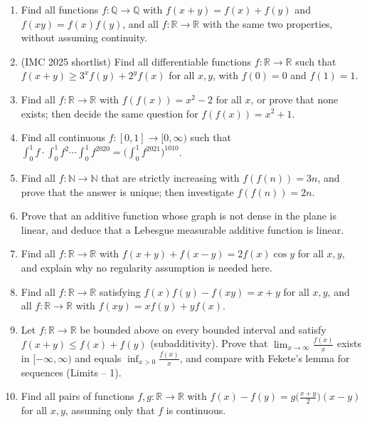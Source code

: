 \documentclass[11pt,a4paper]{article}
\renewcommand{\le}{\leqslant}
\renewcommand{\ge}{\geqslant}
\begin{document}
\begin{enumerate}[leftmargin=2.2em,itemsep=0.6em]
\item Find all functions $f\colon\mathbb Q\to\mathbb Q$ with $f(x+y)=f(x)+f(y)$ and $f(xy)=f(x)f(y)$,
and all $f\colon\mathbb R\to\mathbb R$ with the same two properties, without assuming continuity.

\item (IMC 2025 shortlist) Find all differentiable functions $f\colon\mathbb R\to\mathbb R$ such that
$f(x+y)\ge3^xf(y)+2^yf(x)$ for all $x,y$, with $f(0)=0$ and $f(1)=1$.

\item Find all $f\colon\mathbb R\to\mathbb R$ with $f(f(x))=x^2-2$ for all $x$, or prove that none
exists; then decide the same question for $f(f(x))=x^2+1$.

\item Find all continuous $f\colon[0,1]\to[0,\infty)$ such that
$\int_0^1f\cdot\int_0^1f^2\cdots\int_0^1f^{2020}=\bigl(\int_0^1f^{2021}\bigr)^{1010}$.

\item Find all $f\colon\mathbb N\to\mathbb N$ that are strictly increasing with $f(f(n))=3n$, and
prove that the answer is unique; then investigate $f(f(n))=2n$.

\item Prove that an additive function whose graph is not dense in the plane is linear, and deduce that a
Lebesgue measurable additive function is linear.

\item Find all $f\colon\mathbb R\to\mathbb R$ with $f(x+y)+f(x-y)=2f(x)\cos y$ for all $x,y$, and
explain why no regularity assumption is needed here.

\item Find all $f\colon\mathbb R\to\mathbb R$ satisfying $f(x)f(y)-f(xy)=x+y$ for all $x,y$, and all
$f\colon\mathbb R\to\mathbb R$ with $f(xy)=xf(y)+yf(x)$.

\item Let $f\colon\mathbb R\to\mathbb R$ be bounded above on every bounded interval and satisfy
$f(x+y)\le f(x)+f(y)$ (subadditivity). Prove that $\lim_{x\to\infty}\frac{f(x)}x$ exists in
$[-\infty,\infty)$ and equals $\inf_{x>0}\frac{f(x)}x$, and compare with Fekete's lemma for sequences
(Limits -- 1).

\item Find all pairs of functions $f,g\colon\mathbb R\to\mathbb R$ with
$f(x)-f(y)=g\bigl(\frac{x+y}2\bigr)(x-y)$ for all $x,y$, assuming only that $f$ is continuous.
\end{enumerate}
\end{document}
